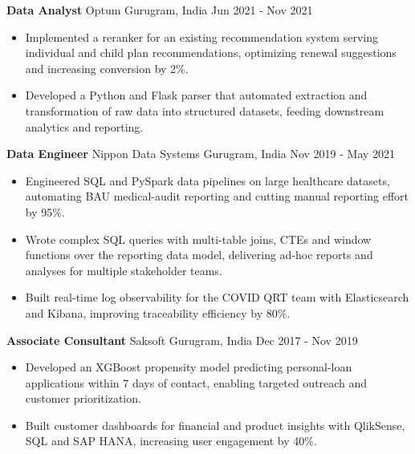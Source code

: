 \documentclass[10pt,a4paper]{article}
\newcommand{\role}[4]{\textbf{#1} \textbar{} #2 \hfill #3 \textbar{} #4\par}
\begin{document}
\vspace{3pt}
\role{Data Analyst}{Optum}{Gurugram, India}{Jun 2021 - Nov 2021}
\begin{itemize}
  \item Implemented a reranker for an existing recommendation system serving individual and child plan recommendations, optimizing renewal suggestions and increasing conversion by 2\%.
  \item Developed a Python and Flask parser that automated extraction and transformation of raw data into structured datasets, feeding downstream analytics and reporting.
\end{itemize}
\vspace{3pt}
\role{Data Engineer}{Nippon Data Systems}{Gurugram, India}{Nov 2019 - May 2021}
\begin{itemize}
  \item Engineered SQL and PySpark data pipelines on large healthcare datasets, automating BAU medical-audit reporting and cutting manual reporting effort by 95\%.
  \item Wrote complex SQL queries with multi-table joins, CTEs and window functions over the reporting data model, delivering ad-hoc reports and analyses for multiple stakeholder teams.
  \item Built real-time log observability for the COVID QRT team with Elasticsearch and Kibana, improving traceability efficiency by 80\%.
\end{itemize}
\vspace{3pt}
\role{Associate Consultant}{Saksoft}{Gurugram, India}{Dec 2017 - Nov 2019}
\begin{itemize}
  \item Developed an XGBoost propensity model predicting personal-loan applications within 7 days of contact, enabling targeted outreach and customer prioritization.
  \item Built customer dashboards for financial and product insights with QlikSense, SQL and SAP HANA, increasing user engagement by 40\%.
\end{itemize}
\end{document}
